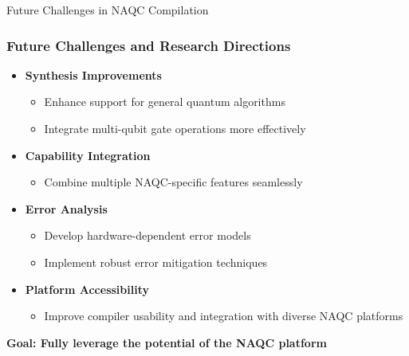 \begin{frame}{Future Challenges in NAQC Compilation}
    \frametitle{Future Challenges and Research Directions}
    \begin{itemize}
        \item \textbf{Synthesis Improvements}
            \begin{itemize}
                \item Enhance support for general quantum algorithms
                \item Integrate multi-qubit gate operations more effectively
            \end{itemize}
        \item \textbf{Capability Integration}
            \begin{itemize}
                \item Combine multiple NAQC-specific features seamlessly
            \end{itemize}
        \item \textbf{Error Analysis}
            \begin{itemize}
                \item Develop hardware-dependent error models
                \item Implement robust error mitigation techniques
            \end{itemize}
        \item \textbf{Platform Accessibility}
            \begin{itemize}
                \item Improve compiler usability and integration with diverse NAQC platforms
            \end{itemize}
    \end{itemize}
    \vspace{0.5em}
    \centering
    \textbf{Goal: Fully leverage the potential of the NAQC platform}
\end{frame}

